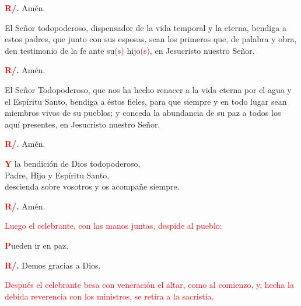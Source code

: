\documentclass[12pt, letterpaper]{report}
\begin{document}
\Large {\bfseries \textcolor{red}{R/.}} \hspace{0.5cm} Am\'en.

\noindent
\Large El Se\~nor todopoderoso, dispensador de la vida temporal y la eterna, bendiga a estos padres, que junto con sus esposas, sean los primeros que, de palabra y obra, den testimonio de la fe ante su\textcolor{red}{(}s\textcolor{red}{)} hijo\textcolor{red}{(}s\textcolor{red}{)}, en Jesucristo nuestro Se\~nor.

\Large {\bfseries \textcolor{red}{R/.}} \hspace{0.5cm} Am\'en.

\noindent
\Large El Se\~nor Todopoderoso, que nos ha hecho renacer a la vida eterna por el agua y el Esp\'iritu Santo, bendiga a \'estos fieles, para que siempre y en todo lugar sean miembros vivos de su pueblos; y conceda la abundancia de su paz a todos los aqu\'i presentes, en Jesucristo nuestro Se\~nor.

\Large {\bfseries \textcolor{red}{R/.}} \hspace{0.5cm} Am\'en.

\newpage

\lettrine[lines=1]{\bfseries \textcolor{red}{Y}}{} \Large la bendici\'on de Dios todopoderoso, \\
Padre, Hijo \Huge{\textcolor{red}{}} \Large y Esp\'iritu Santo, \\
descienda sobre vosotros y os acompa\~ne siempre.

\Large {\bfseries \textcolor{red}{R/.}} \hspace{0.5cm} Am\'en.

\large{\textcolor{red}{Luego el celebrante, con las manos juntas, despide al pueblo:}}

\lettrine[lines=1]{\bfseries \textcolor{red}{P}}{}\Large ueden ir en paz.

\Large {\bfseries \textcolor{red}{R/.}} \hspace{0.5cm} Demos gracias a Dios.

\large{\textcolor{red}{Despu\'es el celebrante besa con veneraci\'on el altar, como al comienzo, y, hecha la debida reverencia con los ministros, se retira a la sacrist\'ia.}}

\end{document}
